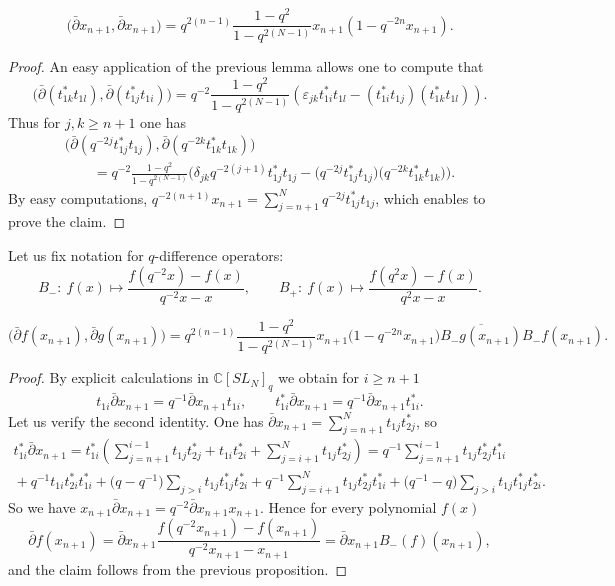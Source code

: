 \begin{proposition}
\[
\big(\bar \partial x_{n+1}, \bar \partial x_{n+1}\big)= q^{2(n-1)} \frac{1-q^2}{1-q^{2(N-1)}}
x_{n+1}(1-q^{-2n}x_{n+1}).
\]
\end{proposition}

\begin{proof} An easy application of the previous lemma allows one to compute that
\[
\big(\bar \partial (t_{1k}^*t_{1l}), \bar \partial
(t_{1j}^*t_{1i})\big)=q^{-2}\frac{1-q^2}{1-q^{2(N-1)}}(\varepsilon_{jk}t_{1i}^*t_{1l}-(t_{1i}^*t_{1j})(t_{1k}^*t_{1l})).
\]
Thus for $j,k \geq n+1$ one has
\begin{gather*}
\big(\bar \partial (q^{-2j}t_{1j}^*t_{1j}), \bar \partial
(q^{-2k}t_{1k}^*t_{1k})\big)\\
\qquad{} =q^{-2}\frac{1-q^2}{1-q^{2(N-1)}}\big(\delta_{jk}q^{-2(j+1)}t_{1j}^*t_{1j}
-\big(q^{-2j}t_{1j}^*t_{1j}\big)\big(q^{-2k}t_{1k}^*t_{1k}\big)\big).
\end{gather*}
By easy computations, $q^{-2(n+1)}x_{n+1}=\sum\limits_{j=n+1}^N q^{-2j}t_{1j}^*t_{1j}$, which enables to prove the
claim.
\end{proof}

Let us f\/ix notation for $q$-dif\/ference operators:
\[
B_-: \ f(x) \mapsto \frac{f(q^{-2}x)-f(x)}{q^{-2}x-x}, \qquad B_+: \ f(x) \mapsto \frac{f(q^2x)-f(x)}{q^2x-x}.
\]
\begin{lemma}\label{lem_dbar}
\[
\big(\bar \partial f(x_{n+1}), \bar \partial g(x_{n+1})\big)= q^{2(n-1)} \frac{1-q^2}{1-q^{2(N-1)}} x_{n+1}
\big(1-q^{-2n}x_{n+1}\big) \overline{B_-g(x_{n+1})} B_-f(x_{n+1}).
\]
\end{lemma}
\begin{proof} By explicit calculations in $\mathbb C[SL_N]_q$ we obtain for $i \geq n+1$
\[
t_{1i}\bar \partial x_{n+1}= q^{-1} \bar \partial x_{n+1} t_{1i}, \qquad t_{1i}^* \bar \partial
x_{n+1}=q^{-1} \bar
\partial x_{n+1} t_{1i}^*.
\]
Let us verify the second identity. One has $\bar \partial x_{n+1}=\sum\limits_{j=n+1}^Nt_{1j}t_{2j}^*$, so
\begin{gather*}
t_{1i}^*\bar \partial x_{n+1}=t_{1i}^*  \left(\sum_{j=n+1}^{i-1}
t_{1j}t_{2j}^*+t_{1i}t_{2i}^*+\sum_{j=i+1}^Nt_{1j}t_{2j}^*\right) = q^{-1} \sum_{j=n+1}^{i-1}t_{1j}t_{2j}^*
  t_{1i}^*
\\
{}
+q^{-1}t_{1i}t_{2i}^*t_{1i}^*+\big(q-q^{-1}\big)\sum_{j>i}t_{1j}t_{1j}^*t_{2i}^*+q^{-1}\sum_{j=i+1}^N
t_{1j}t_{2j}^*t_{1i}^*+\big(q^{-1}-q\big)\sum_{j>i}t_{1j}t_{1j}^*t_{2i}^*.
\end{gather*}
So we have $x_{n+1}\bar \partial x_{n+1}=q^{-2} \bar
\partial x_{n+1} x_{n+1}$. Hence for every polynomial $f(x)$
\[
\bar \partial f(x_{n+1})=\bar \partial x_{n+1}\frac{f(q^{-2}x_{n+1})-f(x_{n+1})}{q^{-2}x_{n+1}-x_{n+1}}=\bar
\partial x_{n+1} B_-(f)(x_{n+1}),
\]
and  the claim follows from the previous proposition. \end{proof}

